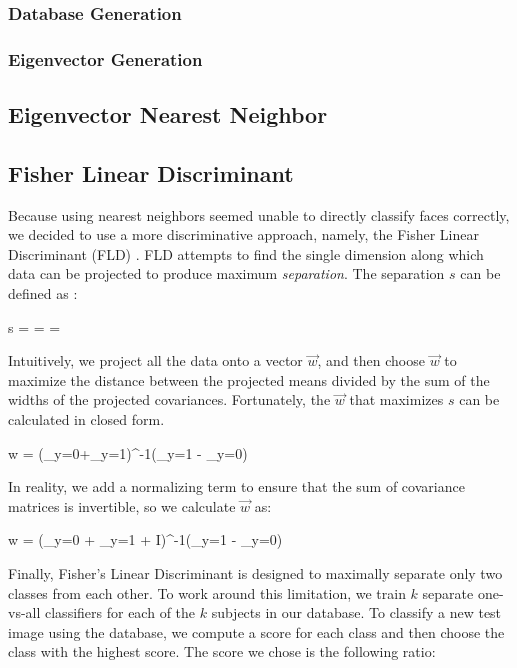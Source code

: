 \subsubsection{Database Generation}
\subsubsection{Eigenvector Generation}



\subsection{Eigenvector Nearest Neighbor}



\subsection{Fisher Linear Discriminant}


Because using nearest neighbors seemed unable to directly classify
faces correctly, we decided to use a more discriminative approach,
namely, the Fisher Linear Discriminant (FLD) \cite{wikiFld}.  FLD
attempts to find the single dimension along which data can be
projected to produce maximum \emph{separation}.  The separation $s$
can be defined as \cite{wikiFld}:

\be
s = =  = 
\ee

\noindent Intuitively, we project all the data onto a vector $\vec w$,
and then choose $\vec w$ to maximize the distance between the
projected means divided by the sum of the widths of the projected
covariances.  Fortunately, the $\vec w$ that maximizes $s$ can be
calculated in closed form.

\be
\vec w = (\Sigma_{y=0}+\Sigma_{y=1})^{-1}(\vec \mu_{y=1} - \vec \mu_{y=0})
\ee

\noindent In reality, we add a normalizing term to ensure that the sum
of covariance matrices is invertible, so we calculate $\vec w$ as:

\be
\vec w = (\Sigma_{y=0} + \Sigma_{y=1} + \epsilon I)^{-1}(\vec \mu_{y=1} - \vec \mu_{y=0})
\ee

Finally, Fisher's Linear Discriminant is designed to maximally
separate only two classes from each other.  To work around this
limitation, we train $k$ separate one-vs-all classifiers for each of
the $k$ subjects in our database.  To classify a new test image using
the database, we compute a score for each class and then choose the
class with the highest score.  The score we chose is the following
ratio:

